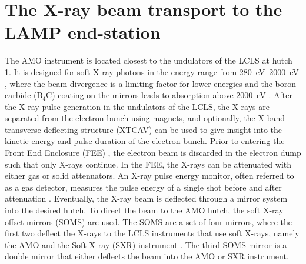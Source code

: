 \section{The X-ray beam transport to the LAMP end-station}\label{sec:amo-instrument}
The AMO instrument is located closest to the undulators of the LCLS at hutch 1. It is designed for soft X-ray photons in the energy range from \SIrange{280}{2000}{\electronvolt} \citep{Ferguson-2015-JSR,Bozek-2009-EPJST}, where the beam divergence is a limiting factor for lower energies and the boron carbide (B$_{4}$C)-coating on the mirrors leads to absorption above \SI{2000}{\electronvolt} \cite{Bozek-2009-EPJST}. After the X-ray pulse generation in the undulators of the LCLS, the X-rays are separated from the electron bunch using magnets, and optionally, the X-band transverse deflecting structure (XTCAV) \citep{Behrens-2014-NatCom} can be used to give insight into the kinetic energy and pulse duration of the electron bunch. Prior to entering the Front End Enclosure (FEE) \citep{Moeller-2011-NIMPR}, the electron beam is discarded in the electron dump such that only X-rays continue. In the FEE, the X-rays can be attenuated with either gas or solid attenuators. An X-ray pulse energy monitor, often referred to as a gas detector, measures the pulse energy of a single shot before and after attenuation \citep{Hau-Riege-2010-PRL-2}. Eventually, the X-ray beam is deflected through a mirror system into the desired hutch. To direct the beam to the AMO hutch, the soft X-ray offset mirrors (SOMS) are used. The SOMS are a set of four mirrors, where the first two deflect the X-rays to the LCLS instruments that use soft X-rays, namely the AMO and the Soft X-ray (SXR) instrument \citep{Schlotter-2012-RSI,Soufli-2012-AppOpt,Dakovski-2015-JSR}. The third SOMS mirror is a double mirror that either deflects the beam into the AMO or SXR instrument.
%
